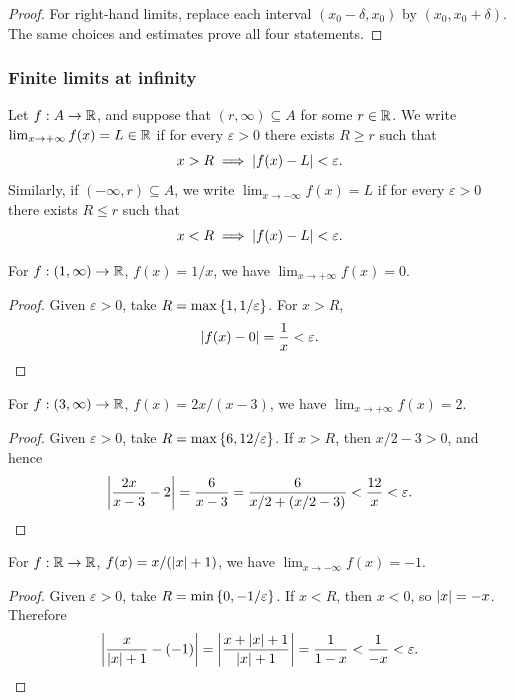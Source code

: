 \documentclass[11pt,a4paper]{amsart}
\begin{document}
\begin{proof}
  For right-hand limits, replace each interval
  \((x_0-\delta,x_0)\) by \((x_0,x_0+\delta)\). The same choices
  and estimates prove all four statements.
\end{proof}

\subsubsection{Finite limits at infinity}

\begin{definition}
  Let \(f:A\to\RR\), and suppose that \((r,\infty)\subseteq A\)
  for some \(r\in\RR\). We write \(\lim_{x\to+\infty}f(x)=L\in\RR\)
  if for every \(\varepsilon>0\) there exists \(R\geq r\) such that
  \[
    x>R\implies\abs{f(x)-L}<\varepsilon.
  \]
  Similarly, if \(( -\infty,r)\subseteq A\), we write
  \(\lim_{x\to-\infty}f(x)=L\) if for every \(\varepsilon>0\)
  there exists \(R\leq r\) such that
  \[
    x<R\implies\abs{f(x)-L}<\varepsilon.
  \]
\end{definition}

\begin{example}
  For \(f:(1,\infty)\to\RR\), \(f(x)=1/x\), we have
  \(\lim_{x\to+\infty}f(x)=0\).
\end{example}

\begin{proof}
  Given \(\varepsilon>0\), take \(R=\max\set{1,1/\varepsilon}\).
  For \(x>R\),
  \[
    \abs{f(x)-0}=\frac1x<\varepsilon.
  \]
\end{proof}

\begin{example}
  For \(f:(3,\infty)\to\RR\), \(f(x)=2x/(x-3)\), we have
  \(\lim_{x\to+\infty}f(x)=2\).
\end{example}

\begin{proof}
  Given \(\varepsilon>0\), take \(R=\max\set{6,12/\varepsilon}\).
  If \(x>R\), then \(x/2-3>0\), and hence
  \[
    \abs*{\frac{2x}{x-3}-2}
    =\frac6{x-3}
    =\frac6{x/2+(x/2-3)}
    <\frac{12}{x}<\varepsilon.
  \]
\end{proof}

\begin{example}
  For \(f:\RR\to\RR\), \(f(x)=x/(\abs{x}+1)\), we have
  \(\lim_{x\to-\infty}f(x)=-1\).
\end{example}

\begin{proof}
  Given \(\varepsilon>0\), take \(R=\min\set{0,-1/\varepsilon}\).
  If \(x<R\), then \(x<0\), so \(\abs{x}=-x\). Therefore
  \[
    \abs*{\frac{x}{\abs{x}+1}-(-1)}
    =\abs*{\frac{x+\abs{x}+1}{\abs{x}+1}}
    =\frac1{1-x}<\frac1{-x}<\varepsilon.
  \]
\end{proof}
\end{document}
